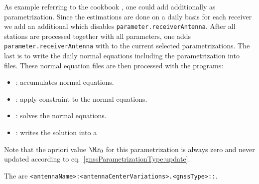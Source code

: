 As example referring to the cookbook ,
one could add additionally  as parametrization.
Since the estimations are done on a daily basis for each receiver we add an additional
 which
disables \verb|parameter.receiverAntenna|. After all stations are processed together with all parameters, one
adds \verb|parameter.receiverAntenna| with 
 to the current selected parametrizations.
The last  is 
to write the daily normal equations including the parametrization  into files.
These normal equation files are then processed with the programs:

\begin{itemize}
  \item {}: accumulates normal equations.
  \item {}: apply constraint to the normal equations.
  \item {}: solves the normal equations.
  \item {}: writes the solution into a 
\end{itemize}

Note that the apriori value $\M x_0$ for this parametrization is always zero and never updated
according to eq.~\eqref{gnssParametrizationType:update}.

The  are
\verb|<antennaName>:<antennaCenterVariations>.<gnssType>::|.


